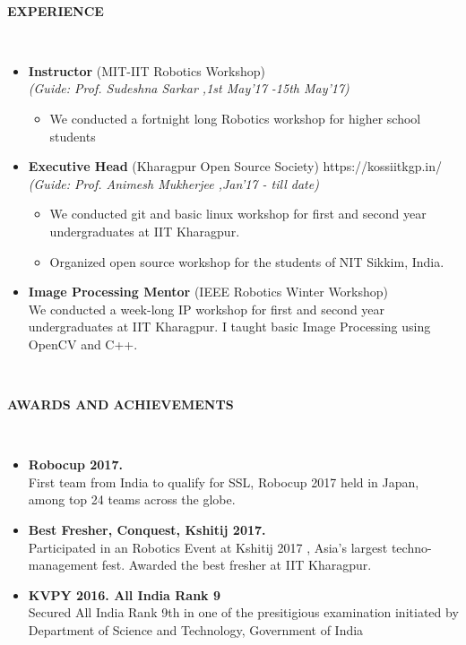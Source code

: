 \documentclass[a4paper,10pt]{article}
\newcommand{\isep}{-2 pt}
\newcommand{\lsep}{-0.5cm}
\newcommand{\resheading}[1]{{\small \colorbox{mygrey}{\begin{minipage}{0.975\textwidth}{\textbf{#1 \vphantom{p\^{E}}}}\end{minipage}}}}
\begin{document}
\hspace{0.5cm}\\[-0.2cm]
\resheading{\textbf{ EXPERIENCE } }\\[\lsep]
\begin{itemize}
\item \textbf{Instructor} (MIT-IIT Robotics Workshop) \\
 \emph{(Guide: Prof. Sudeshna Sarkar
,1st May'17 -15th May'17)} \\[-0.6cm]
	\begin{itemize}\itemsep \isep
	\item We conducted a fortnight long Robotics workshop for higher school students
	\end{itemize} 

\item \textbf{Executive Head} (Kharagpur Open Source Society) \hspace{0.5cm} {https://kossiitkgp.in/}\\
 \emph{(Guide: Prof. Animesh Mukherjee
,Jan'17 - till date)} \\[-0.6cm]
	\begin{itemize}\itemsep \isep
	\item We conducted git and basic linux workshop for first and second year undergraduates at IIT Kharagpur.
	\item Organized open source workshop for the students of NIT Sikkim, India.
	\end{itemize}

\item \textbf{Image Processing Mentor} (IEEE Robotics Winter Workshop) \\
	We conducted a week-long IP workshop for first and second year undergraduates at IIT Kharagpur. I taught basic Image Processing using OpenCV and C++.
	

\end{itemize}

\hspace{0.5cm}\\[-0.2cm]
\resheading{\textbf{AWARDS AND ACHIEVEMENTS} }\\[\lsep]
\begin{itemize}
\item \noindent \textbf{Robocup 2017.} \\
First team from India to qualify for SSL, Robocup 2017 held in Japan, among top 24 teams across the globe.

\item \noindent \textbf{Best Fresher, Conquest, Kshitij 2017.} \\
Participated in an Robotics Event at
Kshitij 2017
, Asia’s largest techno-management fest.  Awarded the
best fresher at IIT Kharagpur.

\item \noindent \textbf{KVPY 2016. All India Rank 9} \\
Secured All India Rank 9th in one of the presitigious examination initiated by Department of Science and Technology, Government of India
\end{itemize}
\end{document}
